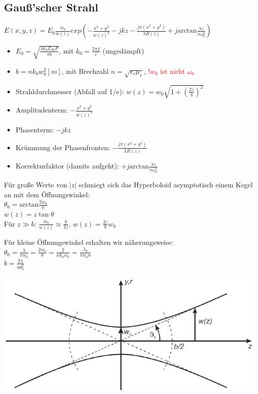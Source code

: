 \documentclass[english]{latex4ei/latex4ei_sheet}
\newcommand{\danger}[1]{\textcolor{red}{#1}}
\begin{document}
\begin{sectionbox}
	\subsection{Gauß'scher Strahl}
	\begin{emphbox}
		$E(x,y,z) = E_0\frac{w_0}{w(z)}exp\left(-\frac{x^2+y^2}{w(z)^2} -jkz - \frac{j\pi (x^2+y^2)}{\lambda R(z)} +j\text{arctan}\frac{\lambda z}{\pi \omega_0^2}\right)$
	\end{emphbox}
	\begin{itemize}
		\item $E_0 = \sqrt{\frac{4 k_{0} Z_{F 0} P}{\pi b}}$, mit $k_0 = \frac{2\pi f}{c}$ (ungedämpft)
		\item $b = n k_0 w_0^2[m]$, mit Brechzahl $n = \sqrt{\epsilon_r \mu_r}$, \danger{!$w_0$ ist nicht $\omega_0$}
		\item Strahldurchmesser (Abfall auf 1/e): $w(z) = w_0 \sqrt{1 + \left(\frac{2z}{b}\right)^2}$
		\item Amplitudenterm: $-\frac{x^2+y^2}{w(z)^2}$
		\item Phasenterm: $-jkz$
		\item Krümmung der Phasenfronten: $- \frac{j\pi (x^2+y^2)}{\lambda R(z)}$
		\item Korrekturfaktor (damits aufgeht): $+j\text{arctan}\frac{\lambda z}{\pi \omega_0^2}$
	\end{itemize}
	Für große Werte von $|z|$ schmiegt sich das Hyperboloid asymptotisch einem Kegel an mit dem Öffnungswinkel:\\
	$\theta_0 = \text{arctan}\frac{2w_0}{b}$\\
	$w(z) = z\tan\theta$\\
	Für $z \gg b$: $\frac{w_0}{w(z)} \approx \frac{b}{2z}$, $w(z) = \frac{2z}{b}w_0$
	
	Für kleine Öffnungswinkel erhalten wir näherungsweise:\\
	$\theta_0 = \frac{\lambda}{\pi w_0} = \frac{2w_0}{b} = \frac{2}{nk_0w_0} = \frac{\lambda_0}{\pi w_0 n}$\\
	$b=\frac{2 \lambda}{\pi \theta_{0}^{2}}$

	\includegraphics[width = \columnwidth]{./img/gauss_strahl.png}\\
	

\end{sectionbox}
\end{document}
